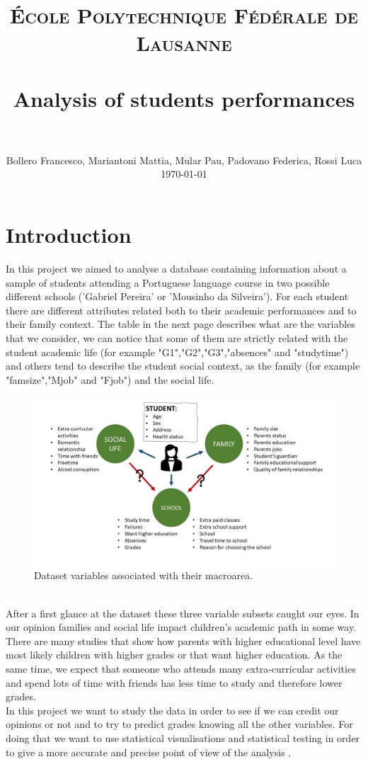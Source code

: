 \documentclass[a4paper, 11pt]{report}
\title{
		\usefont{OT1}{bch}{b}{n}
		\normalfont \normalsize \textsc{École Polytechnique Fédérale de Lausanne} \\ [25pt]
		\horrule{0.5pt} \\[0.4cm]
		\huge Analysis of students performances \\
		\horrule{2pt} \\[0.5cm]
}
\author{
		\normalfont 								\normalsize
        Bollero Francesco, Mariantoni Mattia, Mular Pau, Padovano Federica, Rossi Luca\\[-3pt]		\normalsize
        \today
}
\date{}
\theoremstyle{definition}
\numberwithin{equation}{section}		%
\numberwithin{figure}{section}			%
\numberwithin{table}{section}				%
\begin{document}
\maketitle
\section{Introduction}
In this project we aimed to analyse a database containing information about a sample of students attending a Portuguese language course in two possible different schools ('Gabriel Pereira' or 'Mousinho da Silveira'). For each student there are different attributes related both to their academic performances and to their family context. The table in the next page describes what are the variables that we consider, we can notice that some of them are strictly related with the student academic life (for example "G1","G2","G3","absences" and "studytime") and others tend to describe the student social context, as the family (for example "famsize","Mjob" and "Fjob") and the social life.

\begin{figure}[h]\centering
\includegraphics[scale=0.4]{variables.jpg}
\caption{Dataset variables associated with their macroarea.}
\end{figure}

\\After a first glance at the dataset these three variable subsets caught our eyes. In our opinion families and social life impact children's academic path in some way. There are many studies that show how parents with higher educational level have most likely children with higher grades or that want higher education. As the same time, we expect that someone who attends many extra-curricular activities and spend lots of time with friends has less time to study and therefore lower grades.
\\In this project we want to study the data in order to see if we can credit our opinions or not and to try to predict grades knowing all the other variables. For doing that we want to use statistical visualisations and statistical testing in order to give a more accurate and precise point of view of the analysis .
\end{document}
